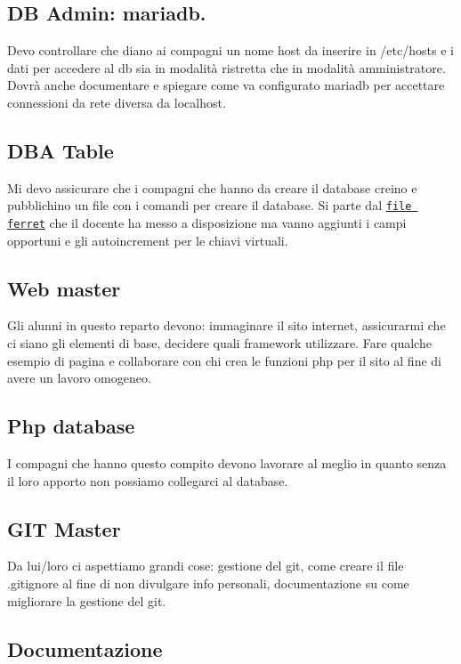 \subsection*{DB Admin\+: mariadb.}

Devo controllare che diano ai compagni un nome host da inserire in /etc/hosts e i dati per accedere al db sia in modalità ristretta che in modalità amministratore. Dovrà anche documentare e spiegare come va configurato mariadb per accettare connessioni da rete diversa da localhost.

\subsection*{D\+BA Table}

Mi devo assicurare che i compagni che hanno da creare il database creino e pubblichino un file con i comandi per creare il database. Si parte dal \href{./manuali/documenti.ger}{\tt file ferret} che il docente ha messo a disposizione ma vanno aggiunti i campi opportuni e gli autoincrement per le chiavi virtuali.

\subsection*{Web master}

Gli alunni in questo reparto devono\+: immaginare il sito internet, assicurarmi che ci siano gli elementi di base, decidere quali framework utilizzare. Fare qualche esempio di pagina e collaborare con chi crea le funzioni php per il sito al fine di avere un lavoro omogeneo.

\subsection*{Php database}

I compagni che hanno questo compito devono lavorare al meglio in quanto senza il loro apporto non possiamo collegarci al database.

\subsection*{G\+IT Master}

Da lui/loro ci aspettiamo grandi cose\+: gestione del git, come creare il file .gitignore al fine di non divulgare info personali, documentazione su come migliorare la gestione del git.

\subsection*{Documentazione}

